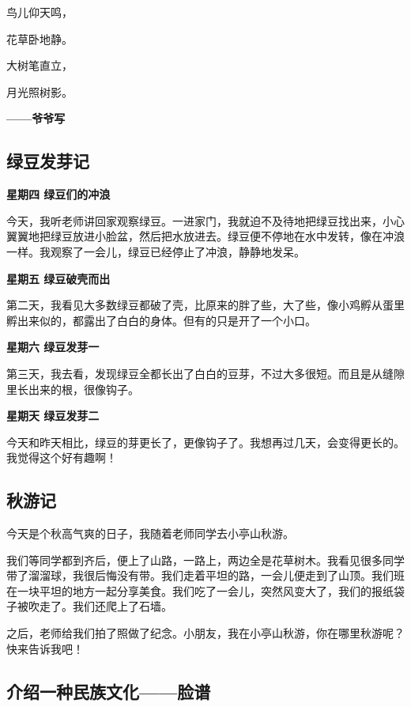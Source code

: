 \documentclass[UTF8,a4paper,titlepage,twoside,10.5pt]{article}
\begin{document}
\vspace*{\baselineskip}

鸟儿仰天鸣，

花草卧地静。

大树笔直立，

月光照树影。

\textbf{——爷爷写}

\subsection{绿豆发芽记}
\label{sec:org5cfd232}

\textbf{星期四  绿豆们的冲浪}

今天，我听老师讲回家观察绿豆。一进家门，我就迫不及待地把绿豆找出来，小心翼翼地把绿豆放进小脸盆，然后把水放进去。绿豆便不停地在水中发转，像在冲浪一样。我观察了一会儿，绿豆已经停止了冲浪，静静地发呆。

\textbf{星期五  绿豆破壳而出}

第二天，我看见大多数绿豆都破了壳，比原来的胖了些，大了些，像小鸡孵从蛋里孵出来似的，都露出了白白的身体。但有的只是开了一个小口。

\textbf{星期六 绿豆发芽一}

第三天，我去看，发现绿豆全都长出了白白的豆芽，不过大多很短。而且是从缝隙里长出来的根，很像钩子。

\textbf{星期天 绿豆发芽二}

今天和昨天相比，绿豆的芽更长了，更像钩子了。我想再过几天，会变得更长的。我觉得这个好有趣啊！

\subsection{秋游记}
\label{sec:orgaa83411}

今天是个秋高气爽的日子，我随着老师同学去小亭山秋游。

我们等同学都到齐后，便上了山路，一路上，两边全是花草树木。我看见很多同学带了溜溜球，我很后悔没有带。我们走着平坦的路，一会儿便走到了山顶。我们班在一块平坦的地方一起分享美食。我们吃了一会儿，突然风变大了，我们的报纸袋子被吹走了。我们还爬上了石墙。

之后，老师给我们拍了照做了纪念。小朋友，我在小亭山秋游，你在哪里秋游呢？快来告诉我吧！

\subsection{介绍一种民族文化——脸谱}
\label{sec:org0de3e36}
\end{document}
